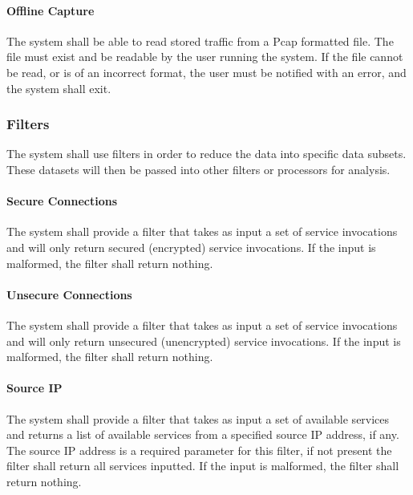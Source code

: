 \documentclass[titlepage]{article}
\begin{document}
\paragraph{Offline Capture}

The system shall be able to read stored traffic from a Pcap formatted file.
The file must exist and be readable by the user running the system.  If the
file cannot be read, or is of an incorrect format, the user must be notified
with an error, and the system shall exit.


\subsubsection{Filters}
The system shall use filters in order to reduce the data into specific data
subsets.  These datasets will then be passed into other filters or
processors for analysis.

\paragraph{Secure Connections}

The system shall provide a filter that takes as input a set of service
invocations and will only return secured (encrypted) service invocations.  If
the input is malformed, the filter shall return nothing.

\paragraph{Unsecure Connections}

The system shall provide a filter that takes as input a set of service
invocations and will only return unsecured (unencrypted) service invocations.
If the input is malformed, the filter shall return nothing.

\paragraph{Source IP}

The system shall provide a filter that takes as input a set of available
services and returns a list of available services from a specified source IP
address, if any.  The source IP address is a required parameter for this
filter, if not present the filter shall return all services inputted.  If the
input is malformed, the filter shall return nothing.
\end{document}

